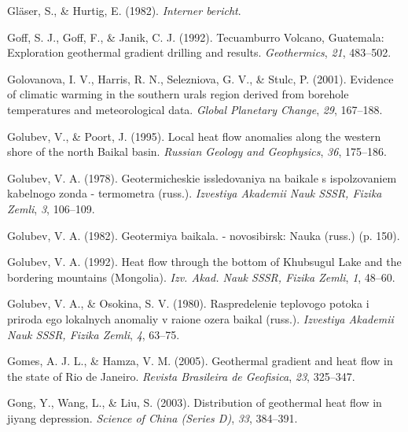 \begin{CSLReferences}{1}{1}
\leavevmode{}%
Gläser, S., \& Hurtig, E. (1982). \emph{Interner bericht}.

\leavevmode{}%
Goff, S. J., Goff, F., \& Janik, C. J. (1992). {Tecuamburro Volcano, Guatemala}: Exploration geothermal gradient drilling and results. \emph{Geothermics}, \emph{21}, 483--502.

\leavevmode{}%
Golovanova, I. V., Harris, R. N., Selezniova, G. V., \& Stulc, P. (2001). Evidence of climatic warming in the southern urals region derived from borehole temperatures and meteorological data. \emph{Global Planetary Change}, \emph{29}, 167--188.

\leavevmode{}%
Golubev, V., \& Poort, J. (1995). Local heat flow anomalies along the western shore of the north {Baikal} basin. \emph{Russian Geology and Geophysics}, \emph{36}, 175--186.

\leavevmode{}%
Golubev, V. A. (1978). Geotermicheskie issledovaniya na baikale s ispolzovaniem kabelnogo zonda - termometra (russ.). \emph{Izvestiya Akademii Nauk SSSR, Fizika Zemli}, \emph{3}, 106--109.

\leavevmode{}%
Golubev, V. A. (1982). Geotermiya baikala. - novosibirsk: Nauka (russ.) (p. 150).

\leavevmode{}%
Golubev, V. A. (1992). Heat flow through the bottom of {Khubsugul Lake} and the bordering mountains {(Mongolia)}. \emph{Izv. Akad. Nauk SSSR, Fizika Zemli}, \emph{1}, 48--60.

\leavevmode{}%
Golubev, V. A., \& Osokina, S. V. (1980). Raspredelenie teplovogo potoka i priroda ego lokalnych anomaliy v raione ozera baikal (russ.). \emph{Izvestiya Akademii Nauk SSSR, Fizika Zemli}, \emph{4}, 63--75.

\leavevmode{}%
Gomes, A. J. L., \& Hamza, V. M. (2005). Geothermal gradient and heat flow in the state of {Rio de Janeiro}. \emph{Revista Brasileira de Geofisica}, \emph{23}, 325--347.

\leavevmode{}%
Gong, Y., Wang, L., \& Liu, S. (2003). Distribution of geothermal heat flow in jiyang depression. \emph{Science of China (Series D)}, \emph{33}, 384--391.


\end{CSLReferences}
